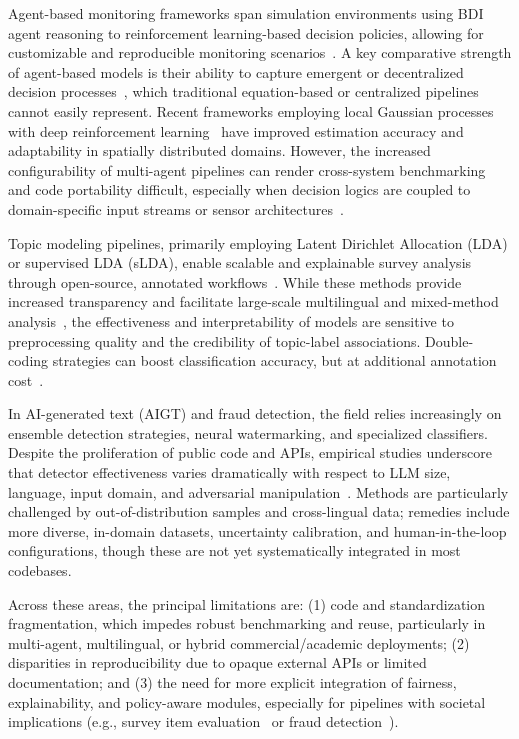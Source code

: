\documentclass[sigconf]{acmart}
\begin{document}
Agent-based monitoring frameworks span simulation environments using BDI agent reasoning to reinforcement learning-based decision policies, allowing for customizable and reproducible monitoring scenarios~\cite{ref88}\cite{ref112}\cite{ref114}\cite{ref115}. A key comparative strength of agent-based models is their ability to capture emergent or decentralized decision processes~\cite{ref114}, which traditional equation-based or centralized pipelines cannot easily represent. Recent frameworks employing local Gaussian processes with deep reinforcement learning~\cite{ref112} have improved estimation accuracy and adaptability in spatially distributed domains. However, the increased configurability of multi-agent pipelines can render cross-system benchmarking and code portability difficult, especially when decision logics are coupled to domain-specific input streams or sensor architectures~\cite{ref113}\cite{ref115}.

Topic modeling pipelines, primarily employing Latent Dirichlet Allocation (LDA) or supervised LDA (sLDA), enable scalable and explainable survey analysis through open-source, annotated workflows~\cite{ref89}\cite{ref93}\cite{ref94}. While these methods provide increased transparency and facilitate large-scale multilingual and mixed-method analysis~\cite{ref93}, the effectiveness and interpretability of models are sensitive to preprocessing quality and the credibility of topic-label associations. Double-coding strategies can boost classification accuracy, but at additional annotation cost~\cite{ref89}.

In AI-generated text (AIGT) and fraud detection, the field relies increasingly on ensemble detection strategies, neural watermarking, and specialized classifiers. Despite the proliferation of public code and APIs, empirical studies underscore that detector effectiveness varies dramatically with respect to LLM size, language, input domain, and adversarial manipulation~\cite{ref100}. Methods are particularly challenged by out-of-distribution samples and cross-lingual data; remedies include more diverse, in-domain datasets, uncertainty calibration, and human-in-the-loop configurations, though these are not yet systematically integrated in most codebases.

Across these areas, the principal limitations are: (1) code and standardization fragmentation, which impedes robust benchmarking and reuse, particularly in multi-agent, multilingual, or hybrid commercial/academic deployments; (2) disparities in reproducibility due to opaque external APIs or limited documentation; and (3) the need for more explicit integration of fairness, explainability, and policy-aware modules, especially for pipelines with societal implications (e.g., survey item evaluation~\cite{ref92}\cite{ref93} or fraud detection~\cite{ref100}).
\end{document}
